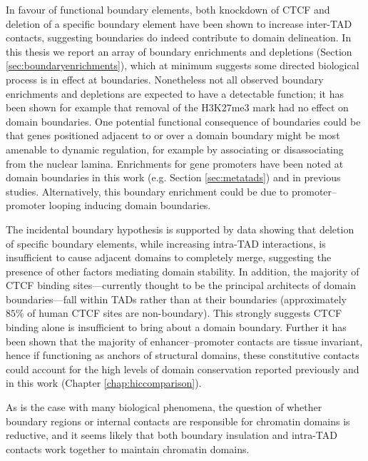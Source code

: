 \documentclass[a4paper,11pt,oneside]{book}
\begin{document}
In favour of functional boundary elements, both knockdown of CTCF\cite{Zuin2013} and deletion of a specific boundary element\cite{Nora2012} have been shown to increase inter-TAD contacts, suggesting boundaries do indeed contribute to domain delineation. In this thesis we report an array of boundary enrichments and depletions (Section \ref{sec:boundaryenrichments}), which at minimum suggests some directed biological process is in effect at boundaries. Nonetheless not all observed boundary enrichments and depletions are expected to have a detectable function; it has been shown for example that removal of the H3K27me3 mark had no effect on domain boundaries.\cite{Nora2012} One potential functional consequence of boundaries could be that genes positioned adjacent to or over a domain boundary might be most amenable to dynamic regulation, for example by associating or disassociating from the nuclear lamina. Enrichments for gene promoters have been noted at domain boundaries in this work (e.g. Section \ref{sec:metatads}) and in previous studies.\cite{Dixon2012} Alternatively, this boundary enrichment could be due to promoter--promoter looping inducing domain boundaries.\cite{Li2012a, Sanyal2012, Sexton2015} %

The incidental boundary hypothesis is supported by data showing that deletion of specific boundary elements, while increasing intra-TAD interactions, is insufficient to cause adjacent domains to completely merge,\cite{Nora2012} suggesting the presence of other factors mediating domain stability. In addition, the majority of CTCF binding sites---currently thought to be the principal architects of domain boundaries---fall within TADs rather than at their boundaries (approximately $85\%$ of human CTCF sites are non-boundary\cite{Dixon2012}). This strongly suggests CTCF binding alone is insufficient to bring about a domain boundary. Further it has been shown that the majority of enhancer--promoter contacts are tissue invariant,\cite{Bouwman2015a} hence if functioning as anchors of structural domains, these constitutive contacts could account for the high levels of domain conservation reported previously\cite{Lieberman2009, Dixon2012, Chambers2013, Rao2014} and in this work (Chapter \ref{chap:hiccomparison}).

As is the case with many biological phenomena, the question of whether boundary regions or internal contacts are responsible for chromatin domains is reductive, and it seems likely that both boundary insulation and intra-TAD contacts work together to maintain chromatin domains.
\end{document}
